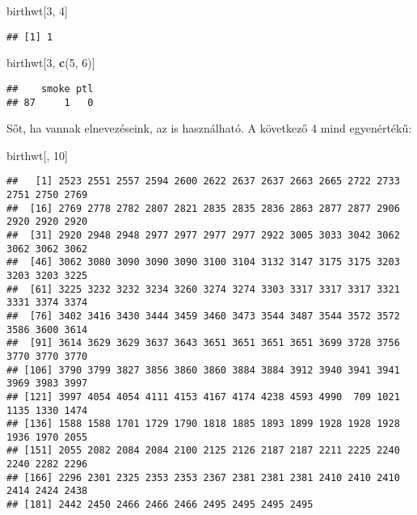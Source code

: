 \documentclass[
]{book}
\newenvironment{Shaded}{\begin{snugshade}}{\end{snugshade}}
\newcommand{\DecValTok}[1]{\textcolor[rgb]{0.00,0.00,0.81}{#1}}
\newcommand{\KeywordTok}[1]{\textcolor[rgb]{0.13,0.29,0.53}{\textbf{#1}}}
\newcommand{\NormalTok}[1]{#1}
\begin{document}
\begin{Shaded}
\begin{Highlighting}[]
\NormalTok{birthwt[}\DecValTok{3}\NormalTok{, }\DecValTok{4}\NormalTok{]}
\end{Highlighting}
\end{Shaded}

\begin{verbatim}
## [1] 1
\end{verbatim}

\begin{Shaded}
\begin{Highlighting}[]
\NormalTok{birthwt[}\DecValTok{3}\NormalTok{, }\KeywordTok{c}\NormalTok{(}\DecValTok{5}\NormalTok{, }\DecValTok{6}\NormalTok{)]}
\end{Highlighting}
\end{Shaded}

\begin{verbatim}
##    smoke ptl
## 87     1   0
\end{verbatim}

Sőt, ha vannak elnevezéseink, az is használható. A következő 4 mind egyenértékű:

\begin{Shaded}
\begin{Highlighting}[]
\NormalTok{birthwt[, }\DecValTok{10}\NormalTok{]}
\end{Highlighting}
\end{Shaded}

\begin{verbatim}
##   [1] 2523 2551 2557 2594 2600 2622 2637 2637 2663 2665 2722 2733 2751 2750 2769
##  [16] 2769 2778 2782 2807 2821 2835 2835 2836 2863 2877 2877 2906 2920 2920 2920
##  [31] 2920 2948 2948 2977 2977 2977 2977 2922 3005 3033 3042 3062 3062 3062 3062
##  [46] 3062 3080 3090 3090 3090 3100 3104 3132 3147 3175 3175 3203 3203 3203 3225
##  [61] 3225 3232 3232 3234 3260 3274 3274 3303 3317 3317 3317 3321 3331 3374 3374
##  [76] 3402 3416 3430 3444 3459 3460 3473 3544 3487 3544 3572 3572 3586 3600 3614
##  [91] 3614 3629 3629 3637 3643 3651 3651 3651 3651 3699 3728 3756 3770 3770 3770
## [106] 3790 3799 3827 3856 3860 3860 3884 3884 3912 3940 3941 3941 3969 3983 3997
## [121] 3997 4054 4054 4111 4153 4167 4174 4238 4593 4990  709 1021 1135 1330 1474
## [136] 1588 1588 1701 1729 1790 1818 1885 1893 1899 1928 1928 1928 1936 1970 2055
## [151] 2055 2082 2084 2084 2100 2125 2126 2187 2187 2211 2225 2240 2240 2282 2296
## [166] 2296 2301 2325 2353 2353 2367 2381 2381 2381 2410 2410 2410 2414 2424 2438
## [181] 2442 2450 2466 2466 2466 2495 2495 2495 2495
\end{verbatim}
\end{document}
